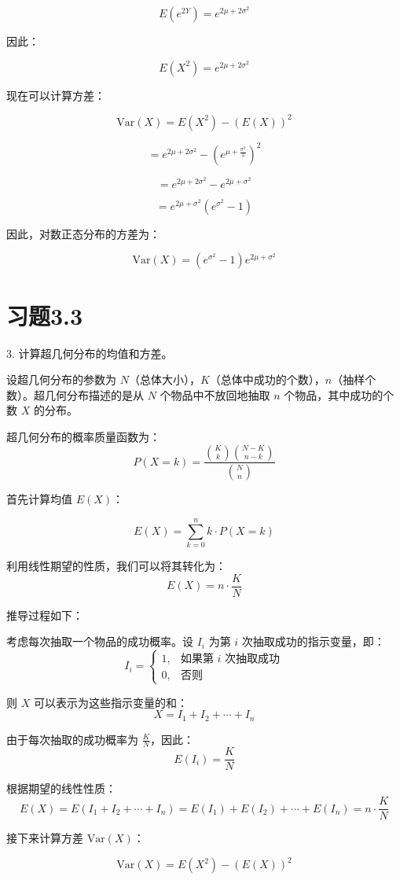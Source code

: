 \documentclass[UTF8]{report}
\theoremstyle{MyLineTheoremStyle} %
\theoremstyle{MyBlockTheoremStyle} %
\theoremstyle{MySubsubsectionStyle} %
\begin{document}
\[
E(e^{2Y}) = e^{2\mu + 2\sigma^2}
\]

因此：

\[
E(X^2) = e^{2\mu + 2\sigma^2}
\]

现在可以计算方差：

\[
\text{Var}(X) = E(X^2) - (E(X))^2
\]

\[
= e^{2\mu + 2\sigma^2} - \left(e^{\mu + \frac{\sigma^2}{2}}\right)^2
\]

\[
= e^{2\mu + 2\sigma^2} - e^{2\mu + \sigma^2}
\]

\[
= e^{2\mu + \sigma^2} (e^{\sigma^2} - 1)
\]

因此，对数正态分布的方差为：

\[
\text{Var}(X) = (e^{\sigma^2} - 1) e^{2\mu + \sigma^2}
\]


\section{习题3.3}

3. 计算超几何分布的均值和方差。

设超几何分布的参数为 \(N\)（总体大小），\(K\)（总体中成功的个数），\(n\)（抽样个数）。超几何分布描述的是从 \(N\) 个物品中不放回地抽取 \(n\) 个物品，其中成功的个数 \(X\) 的分布。

超几何分布的概率质量函数为：
\[
P(X = k) = \frac{\binom{K}{k} \binom{N-K}{n-k}}{\binom{N}{n}}
\]

首先计算均值 \(E(X)\)：

\[
E(X) = \sum_{k=0}^{n} k \cdot P(X = k)
\]

利用线性期望的性质，我们可以将其转化为：
\[
E(X) = n \cdot \frac{K}{N}
\]

推导过程如下：

考虑每次抽取一个物品的成功概率。设 \(I_i\) 为第 \(i\) 次抽取成功的指示变量，即：
\[
I_i = \begin{cases} 
1, & \text{如果第 } i \text{ 次抽取成功} \\
0, & \text{否则}
\end{cases}
\]

则 \(X\) 可以表示为这些指示变量的和：
\[
X = I_1 + I_2 + \cdots + I_n
\]

由于每次抽取的成功概率为 \(\frac{K}{N}\)，因此：
\[
E(I_i) = \frac{K}{N}
\]

根据期望的线性性质：
\[
E(X) = E(I_1 + I_2 + \cdots + I_n) = E(I_1) + E(I_2) + \cdots + E(I_n) = n \cdot \frac{K}{N}
\]

接下来计算方差 \(\text{Var}(X)\)：

\[
\text{Var}(X) = E(X^2) - (E(X))^2
\]
\end{document}
